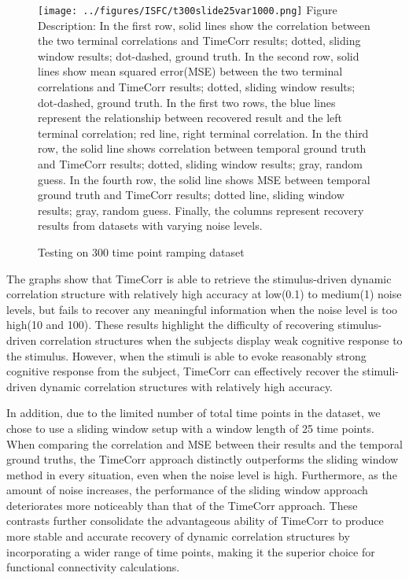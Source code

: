 \documentclass[11pt]{article}
\begin{document}
\begin{figure}[!htb]
\caption{Testing on 300 time point ramping dataset}
\texttt{[image: ../figures/ISFC/t300slide25var1000.png]}
\label{fig:t300slide25var1000}
Figure Description: In the first row, solid lines show the correlation between the two terminal correlations and TimeCorr results; dotted, sliding window results; dot-dashed, ground truth. In the second row, solid lines show mean squared error(MSE) between the two terminal correlations and TimeCorr results; dotted, sliding window results; dot-dashed, ground truth. In the first two rows, the blue lines represent the relationship between recovered result and the left terminal correlation; red line, right terminal correlation. In the third row, the solid line shows correlation between temporal ground truth and TimeCorr results; dotted, sliding window results; gray, random guess. In the fourth row, the solid line shows MSE between temporal ground truth and TimeCorr results; dotted line, sliding window results; gray, random guess. Finally, the columns represent recovery results from datasets with varying noise levels.
\end{figure}

The graphs show that TimeCorr is able to retrieve the stimulus-driven dynamic correlation structure with relatively high accuracy at low(0.1) to medium(1) noise levels, but fails to recover any meaningful information when the noise level is too high(10 and 100). These results highlight the difficulty of recovering stimulus-driven correlation structures when the subjects display weak cognitive response to the stimulus. However, when the stimuli is able to evoke reasonably strong cognitive response from the subject, TimeCorr can effectively recover the stimuli-driven dynamic correlation structures with relatively high accuracy.

In addition, due to the limited number of total time points in the dataset, we chose to use a sliding window setup with a window length of 25 time points. When comparing the correlation and MSE between their results and the temporal ground truths, the TimeCorr approach distinctly outperforms the sliding window method in every situation, even when the noise level is high. Furthermore, as the amount of noise increases, the performance of the sliding window approach deteriorates more noticeably than that of the TimeCorr approach. These contrasts further consolidate the advantageous ability of TimeCorr to produce more stable and accurate recovery of dynamic correlation structures by incorporating a wider range of time points, making it the superior choice for functional connectivity calculations.
\end{document}
